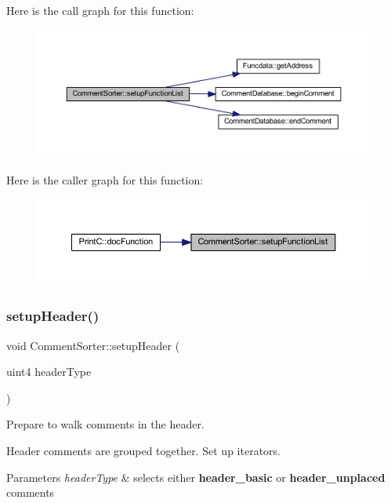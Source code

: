 Here is the call graph for this function\+:
\nopagebreak
\begin{figure}[H]
\begin{center}
\leavevmode
\includegraphics[width=350pt]{class_comment_sorter_a9a79bd6eaeaa2dc69a3cb8246097343a_cgraph}
\end{center}
\end{figure}
Here is the caller graph for this function\+:
\nopagebreak
\begin{figure}[H]
\begin{center}
\leavevmode
\includegraphics[width=350pt]{class_comment_sorter_a9a79bd6eaeaa2dc69a3cb8246097343a_icgraph}
\end{center}
\end{figure}
\mbox{\label{class_comment_sorter_a524cd5b7f4b5a6abb3aa63582b6f09c6}} 
\subsubsection{\texorpdfstring{setupHeader()}{setupHeader()}}
{\footnotesize\ttfamily void Comment\+Sorter\+::setup\+Header (\begin{DoxyParamCaption}\item[{uint4}]{header\+Type }\end{DoxyParamCaption})}



Prepare to walk comments in the header. 

Header comments are grouped together. Set up iterators. 
\begin{DoxyParams}{Parameters}
{\em header\+Type} & selects either {\bfseries{header\+\_\+basic}} or {\bfseries{header\+\_\+unplaced}} comments \\
\hline
\end{DoxyParams}


